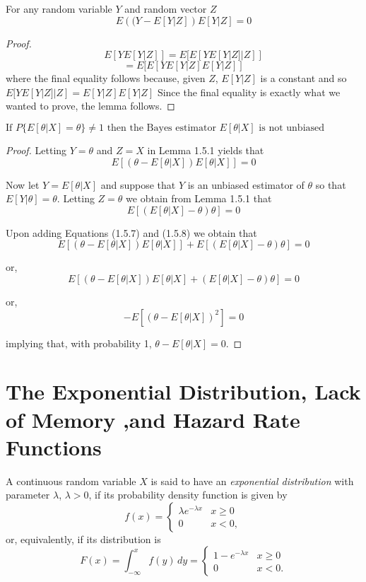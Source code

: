 \documentclass[lang=cn,10pt,thmcnt=section]{elegantbook}
\begin{document}
\begin{lemma}
	For any random variable $Y$ and random vector $Z$
\[
E\left((Y - E[Y | Z]\right) E[Y | Z] = 0
\]
\end{lemma}
\begin{proof}
	\[
E[Y E[Y | Z]] = E[E[Y E[Y | Z] | Z]]
\]
\[
= E[E[Y E[Y | Z] E[Y | Z]]
\]
where the final equality follows because, given $Z$, $E[Y | Z]$ is a constant and so $E[Y E[Y | Z] | Z] = E[Y | Z] E[Y | Z]$ Since the final equality is exactly what we wanted to prove, the lemma follows.
\end{proof}
\begin{proposition}
	$\text{If } P\{E[\theta | X] = \theta\} \neq 1 \text{ then the Bayes estimator } E[\theta | X] \text{ is not unbiased}$
\end{proposition}
\begin{proof}
	Letting $Y = \theta$ and $Z = X$ in Lemma 1.5.1 yields that
\begin{equation}
E[(\theta - E[\theta | X]) E[\theta | X]] = 0 \tag{1.5.7}
\end{equation}

Now let $Y = E[\theta | X]$ and suppose that $Y$ is an unbiased estimator of $\theta$ so that $E[Y | \theta] = \theta$. Letting $Z = \theta$ we obtain from Lemma 1.5.1 that
\begin{equation}
E[(E[\theta | X] - \theta) \theta] = 0 \tag{1.5.8}
\end{equation}

Upon adding Equations (1.5.7) and (1.5.8) we obtain that
\begin{equation}
E[(\theta - E[\theta | X]) E[\theta | X]] + E[(E[\theta | X] - \theta) \theta] = 0
\end{equation}

or,
\begin{equation}
E[(\theta - E[\theta | X]) E[\theta | X] + (E[\theta | X] - \theta) \theta] = 0
\end{equation}

or,
\begin{equation}
-E[(\theta - E[\theta | X])^2] = 0
\end{equation}

implying that, with probability 1, $\theta - E[\theta | X] = 0$.
\end{proof}
\section{The Exponential Distribution, Lack of Memory ,and Hazard Rate Functions }
A continuous random variable $X$ is said to have an \textit{exponential distribution} with parameter $\lambda$, $\lambda > 0$, if its probability density function is given by
\[
f(x) = 
\begin{cases} 
\lambda e^{-\lambda x} & x \geq 0 \\
0 & x < 0,
\end{cases}
\]
or, equivalently, if its distribution is
\[
F(x) = \int_{-\infty}^{x} f(y) \, dy = 
\begin{cases} 
1 - e^{-\lambda x} & x \geq 0 \\
0 & x < 0.
\end{cases}
\]
\end{document}
